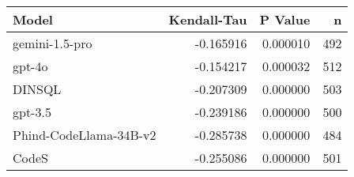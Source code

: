 \begin{tabular}{lrrr}
\toprule
Model & Kendall-Tau & P Value & n \\
\midrule
gemini-1.5-pro & -0.165916 & 0.000010 & 492 \\
gpt-4o & -0.154217 & 0.000032 & 512 \\
DINSQL & -0.207309 & 0.000000 & 503 \\
gpt-3.5 & -0.239186 & 0.000000 & 500 \\
Phind-CodeLlama-34B-v2 & -0.285738 & 0.000000 & 484 \\
CodeS & -0.255086 & 0.000000 & 501 \\
\bottomrule
\end{tabular}
